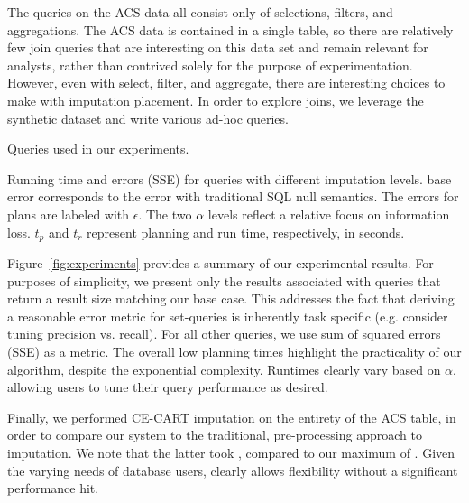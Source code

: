 The queries on the ACS data all consist only of selections, filters, and aggregations.
The ACS data is contained in a single table, so there are relatively few join queries that are interesting on this data set and remain relevant for analysts, rather
than contrived solely for the purpose of experimentation.
However, even with select, filter, and aggregate, there are interesting choices to make with imputation placement. In order to explore joins, we leverage the synthetic
dataset and write various ad-hoc queries.

\begin{table}
  \centerfloat
  
  \caption{Queries used in our experiments.}
  \label{fig:queries}
\end{table}

\begin{table}
  \centerfloat
  
  \caption{Running time and errors (SSE) for queries with different imputation levels. base error corresponds to the
error with traditional SQL null semantics. The errors for \ProjectName{} plans are labeled with $\epsilon$. The two
$\alpha$ levels reflect a relative focus on information loss. $t_p$ and $t_r$ represent planning and run time, respectively, in seconds.}
  \label{fig:experiments}
\end{table}

Figure~\ref{fig:experiments} provides a summary of our experimental results. For purposes of simplicity, we present only the results associated with
queries that return a result size matching our base case. This addresses the fact that deriving a reasonable error metric for set-queries 
is inherently task specific (e.g. consider tuning precision vs. recall). For all other queries, we use sum of squared errors (SSE) as a metric.
The overall low planning times highlight the practicality of our algorithm, despite the exponential complexity. Runtimes clearly vary based on $\alpha$, allowing
users to tune their query performance as desired.


Finally, we performed CE-CART imputation on the entirety of the ACS table, in order to compare our system to the traditional, pre-processing approach to imputation.
We note that the latter took , compared to our maximum of . Given the varying needs of database users, \ProjectName{} clearly allows flexibility without
a significant performance hit.


